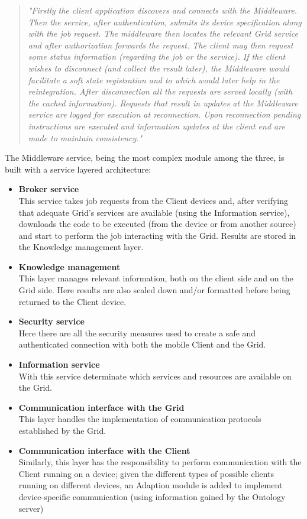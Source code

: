 \begin{quotation}
    \textit{"Firstly the client application discovers and connects with the Middleware. Then the service, after authentication, submits its device specification along with the job request. The middleware then locates the relevant Grid service and after authorization forwards the request. The client may then request some status information (regarding the job or the service). If the client wishes to disconnect (and collect the result later), the Middleware would facilitate a soft state registration and to which would later help in the reintegration. After disconnection all the requests are served locally (with the cached information). Requests that result in updates at the Middleware service are logged for execution at reconnection. Upon reconnection pending instructions are executed and information updates at the client end are made to maintain consistency." \cite{mobile_to_grid_middleware}}
\end{quotation}

The Middleware service, being the most complex module among the three, is built with a service layered architecture:
\begin{itemize}
    \item \textbf{Broker service}\\
    This service takes job requests from the Client devices and, after verifying that adequate Grid's services are available (using the Information service), downloads the code to be executed (from the device or from another source) and start to perform the job interacting with the Grid. Results are stored in the Knowledge management layer.
    \item \textbf{Knowledge management}\\
    This layer manages relevant information, both on the client side and on the Grid side. Here results are also scaled down and/or formatted before being returned to the Client device.
    \item \textbf{Security service}\\
    Here there are all the security measures used to create a safe and authenticated connection with both the mobile Client and the Grid. 
    \item \textbf{Information service}\\
    With this service determinate which services and resources are available on the Grid.
    \item \textbf{Communication interface with the Grid}\\
    This layer handles the implementation of communication protocols established by the Grid.
    \item \textbf{Communication interface with the Client}\\
    Similarly, this layer has the responsibility to perform communication with the Client running on a device; given the different types of possible clients running on different devices, an Adaption module is added to implement device-specific communication (using information gained by the Ontology server)
\end{itemize}

